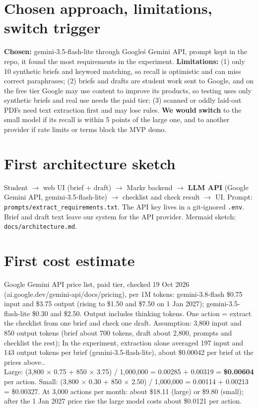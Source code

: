 \documentclass[10pt]{article}
\begin{document}
\section{Chosen approach, limitations, switch trigger}
\textbf{Chosen:} gemini-3.5-flash-lite through Google\'s Gemini API, prompt kept in the repo, it found the most requirements in the experiment. \textbf{Limitations:} (1) only 10 synthetic briefs and keyword matching, so recall is optimistic and can miss correct paraphrases; (2) briefs and drafts are student work sent to Google, and on the free tier Google may use content to improve its products, so testing uses only synthetic briefs and real use needs the paid tier; (3) scanned or oddly laid-out PDFs need text extraction first and may lose rules. \textbf{We would switch} to the small model if its recall is within 5 points of the large one, and to another provider if rate limits or terms block the MVP demo.

\section{First architecture sketch}
Student $\rightarrow$ web UI (brief + draft) $\rightarrow$ Markr backend $\rightarrow$ \textbf{LLM API} (Google Gemini API, gemini-3.5-flash-lite) $\rightarrow$ checklist and check result $\rightarrow$ UI. Prompt: \texttt{prompts/extract\_requirements.txt}. The API key lives in a git-ignored \texttt{.env}. Brief and draft text leave our system for the API provider. Mermaid sketch: \texttt{docs/architecture.md}.

\section{First cost estimate}
Google Gemini API price list, paid tier, checked 19 Oct 2026 (ai.google.dev/gemini-api/docs/pricing), per 1M tokens: gemini-3.8-flash \$0.75 input and \$3.75 output (rising to \$1.50 and \$7.50 on 1 Jan 2027); gemini-3.5-flash-lite \$0.30 and \$2.50. Output includes thinking tokens. One action = extract the checklist from one brief and check one draft. Assumption: 3,800 input and 850 output tokens (brief about 700 tokens, draft about 2,800, prompts and checklist the rest); In the experiment, extraction alone averaged 197 input and 143 output tokens per brief (gemini-3.5-flash-lite), about \$0.00042 per brief at the prices above..\\
Large: (3,800 $\times$ 0.75 + 850 $\times$ 3.75) / 1,000,000 = 0.00285 + 0.00319 = \textbf{\$0.00604} per action. Small: (3,800 $\times$ 0.30 + 850 $\times$ 2.50) / 1,000,000 = 0.00114 + 0.00213 = \$0.00327. At 3,000 actions per month: about \$18.11 (large) or \$9.80 (small); after the 1 Jan 2027 price rise the large model costs about \$0.0121 per action.
\end{document}
